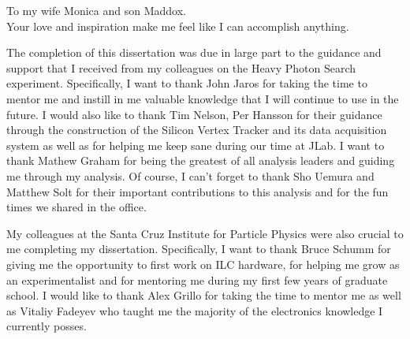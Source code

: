 \documentclass[12pt]{ucthesis}
\begin{document}

\begin{frontmatter}

    \maketitle
    \copyrightpage
    
    \tableofcontents
    \listoffigures
    \listoftables

    \begin{abstract}
        
    \end{abstract}

    \begin{dedication}
        \null\vfil
        {
            \begin{center}
                To my wife Monica and son Maddox. \\
                Your love and inspiration make me feel like I can accomplish anything.
            \end{center}
        }
        \vfil\null
    \end{dedication}

    \begin{acknowledgements}
        The completion of this dissertation was due in large part to the guidance
        and support that I received from my colleagues on the Heavy Photon Search
        experiment.  Specifically, I want to thank John Jaros for taking the
        time to mentor me and instill in me valuable knowledge that I will
        continue to use in the future.  I would also like to thank Tim Nelson, 
        Per Hansson for their guidance through the construction of the Silicon
        Vertex Tracker and its data acquisition system as well as for helping me 
        keep sane during our time at JLab. I want to thank
        Mathew Graham for being the greatest of all analysis leaders and 
        guiding me through my analysis.  Of course, I can't forget to thank
        Sho Uemura and Matthew Solt for their important contributions to this analysis
        and for the fun times we shared in the office.
        

        My colleagues at the Santa Cruz Institute for Particle Physics were also
        crucial to me completing my dissertation.  Specifically, I want to thank
        Bruce Schumm for giving me the opportunity to first work on ILC hardware,
        for helping me grow as an experimentalist and for mentoring me during 
        my first few years of graduate school.
        I would like to
        thank Alex Grillo for taking the time to mentor me as well as Vitaliy Fadeyev
        who taught me the majority of the electronics knowledge I currently posses.


\end{acknowledgements}
\end{frontmatter}
\end{document}
